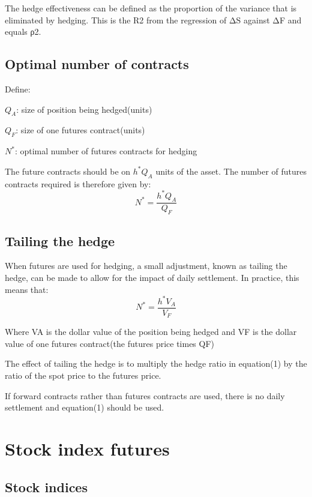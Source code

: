 \documentclass{article}
\begin{document}
The hedge effectiveness can be defined as the proportion of the variance that is eliminated by hedging. This is the R2 from the regression of ΔS against ΔF and equals ρ2.

\subsection{Optimal number of contracts}
Define:

$ Q_A $: size of position being hedged(units)

$ Q_F $: size of one futures contract(units)

$ N^* $: optimal number of futures contracts for hedging

The future contracts should be on $ h^*Q_A $ units of the asset. The number of futures contracts required is therefore given by:
\begin{equation}
	N^*=\frac{h^*Q_A}{Q_F}
\end{equation}

\subsection{Tailing the hedge}
\hspace*{\fill}

When futures are used for hedging, a small adjustment, known as tailing the hedge, can be made to allow for the impact of daily settlement. In practice, this means that:
\begin{equation}
N^*=\frac{h^*V_A}{V_F}
\end{equation}

		
Where VA is the dollar value of the position being hedged and VF is the dollar value of one futures contract(the futures price times QF)

The effect of tailing the hedge is to multiply the hedge ratio in equation(1) by the ratio of the spot price to the futures price.

If forward contracts rather than futures contracts are used, there is no daily settlement and equation(1) should be used.

\section{Stock index futures}
\subsection{Stock indices}
\hspace*{\fill}
\end{document}
